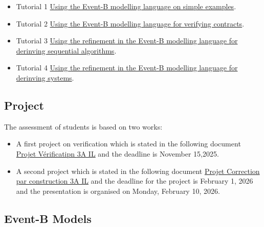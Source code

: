 \documentclass[ 12pt]{article}
\begin{document}
  \begin{itemize}
  \item[]   Tutorial 1
    \href{http://mery54.github.io/teaching/mosos/lecturesnotes/mcfsi-td1.pdf}{Using
      the Event-B modelling language on simple examples}.

   \item[]   Tutorial 2
    \href{http://mery54.github.io/teaching/mosos/lecturesnotes/mcfsi-td2.pdf}{Using
      the Event-B modelling language  for verifying contracts}.



    \item[]   Tutorial 3
    \href{http://mery54.github.io/teaching/mosos/lecturesnotes/mcfsi-td3.pdf}{Using
      the refinement in 
      the Event-B modelling language  for derinving sequential algorithms}.


    
    \item[]   Tutorial 4
    \href{http://mery54.github.io/teaching/mosos/lecturesnotes/mcfsi-td4.pdf}{Using
      the refinement in 
      the Event-B modelling language  for derinving  systems}.


  \end{itemize}

  
  \subsection{Project}
\label{sec:project}

The assessment  of students is based on two works:
\begin{itemize}
\item A first project  on verification  which is stated  in the following
  document  \href{http://mery54.github.io/teaching/mosos/lecturesnotes/project-verification2025.pdf}{Projet
    Vérificatipn    3A IL}  and the deadline is November 15,2025. 
\item A second project which is stated in the following document \href{http://mery54.github.io/teaching/mosos/lecturesnotes/telecom-projects2526.pdf}{Projet
    Correction par construction 
    3A IL}   and the deadline for the project is  February 1, 2026 and the presentation 
is organised on Monday, February 10, 2026. 
\end{itemize}



  \subsection{Event-B Models}
\label{sec:event-b-models}
\end{document}
